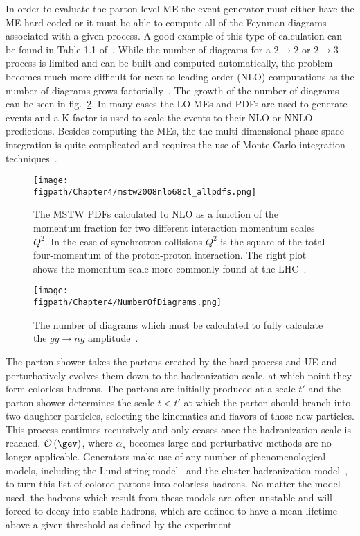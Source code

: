 In order to evaluate the parton level ME the event generator must either have the ME hard coded or it must be able to compute all of the Feynman diagrams associated with a given process.
A good example of this type of calculation can be found in Table 1.1 of~\cite{Siegert:2010cru}.
While the number of diagrams for a $2\rightarrow2$ or $2\rightarrow3$ process is limited and can be built and computed automatically, the problem becomes much more difficult for next to leading order (NLO) computations as the number of diagrams grows factorially~\cite{Kurihara:2002ne}.
The growth of the number of diagrams can be seen in fig.~\ref{fig:NumberOfDiagrams}.
In many cases the LO MEs and PDFs are used to generate events and a K-factor is used to scale the events to their NLO or NNLO predictions.
Besides computing the MEs, the the multi-dimensional phase space integration is quite complicated and requires the use of Monte-Carlo integration techniques~\cite{MonteCarloMethods}.

\begin{figure}[!hbt]
    \vspace*{-0.5cm}
    \centering
    \texttt{[image: \\figpath/Chapter4/mstw2008nlo68cl\_allpdfs.png]}
    \caption{The MSTW PDFs calculated to NLO as a function of the momentum fraction for two different interaction momentum scales $Q^{2}$. In the case of synchrotron collisions $Q^{2}$ is the square of the total four-momentum of the proton-proton interaction. The right plot shows the momentum scale more commonly found at the LHC~\cite{Martin:2009iq}.}
    \label{fig:mstw}
\end{figure}

\begin{figure}[!hbt]
    \vspace*{-0.5cm}
    \centering
    \texttt{[image: \\figpath/Chapter4/NumberOfDiagrams.png]}
    \caption{The number of diagrams which must be calculated to fully calculate the $gg\rightarrow{ng}$ amplitude~\cite{Siegert:2010cru}.}
    \label{fig:NumberOfDiagrams}
\end{figure}

The parton shower takes the partons created by the hard process and UE and perturbatively evolves them down to the hadronization scale, at which point they form colorless hadrons.
The partons are initially produced at a scale $t'$ and the parton shower determines the scale $t<t'$ at which the parton should branch into two daughter particles, selecting the kinematics and flavors of those new particles.
This process continues recursively and only ceases once the hadronization scale is reached, $\mathcal{O}\left(\gev\right)$, where $\alpha_{s}$ becomes large and perturbative methods are no longer applicable. 
Generators make use of any number of phenomenological models, including the Lund string model~\cite{ANDERSSON198331,Andersson:1997hs} and the cluster hadronization model~\cite{WEBBER1984492,Winter:2003tt}, to turn this list of colored partons into colorless hadrons.
No matter the model used, the hadrons which result from these models are often unstable and will forced to decay into stable hadrons, which are defined to have a mean lifetime above a given threshold as defined by the experiment.

